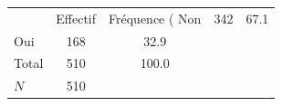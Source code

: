{
\def\sym#1{\ifmmode^{#1}\else\(^{#1}\)\fi}
\begin{tabular}{l*{1}{cc}}
\toprule
            &    Effectif&Fréquence (%
\midrule
Non         &         342&        67.1\\
Oui         &         168&        32.9\\
Total       &         510&       100.0\\
\midrule
\(N\)       &         510&            \\
\bottomrule
\end{tabular}
}

